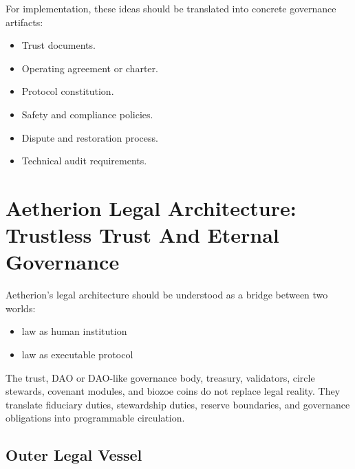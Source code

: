 ﻿\documentclass[12pt]{article}
\begin{document}
For implementation, these ideas should be translated into concrete governance artifacts:

\begin{itemize}
  \item Trust documents.
\end{itemize}
\begin{itemize}
  \item Operating agreement or charter.
\end{itemize}
\begin{itemize}
  \item Protocol constitution.
\end{itemize}
\begin{itemize}
  \item Safety and compliance policies.
\end{itemize}
\begin{itemize}
  \item Dispute and restoration process.
\end{itemize}
\begin{itemize}
  \item Technical audit requirements.
\end{itemize}

\section{Aetherion Legal Architecture: Trustless Trust And Eternal Governance}


Aetherion's legal architecture should be understood as a bridge between two worlds:

\begin{itemize}
  \item law as human institution
\end{itemize}
\begin{itemize}
  \item law as executable protocol
\end{itemize}

The trust, DAO or DAO-like governance body, treasury, validators, circle stewards, covenant modules, and biozoe coins do not replace legal reality. They translate fiduciary duties, stewardship duties, reserve boundaries, and governance obligations into programmable circulation.

\subsection{Outer Legal Vessel}
\end{document}
